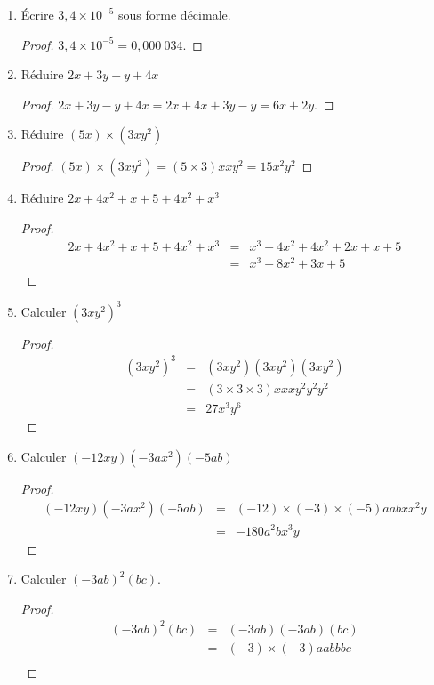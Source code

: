 \documentclass[12 pt]{extarticle}
\theoremstyle{plain}
\begin{document}
\begin{enumerate}
   \begin{proof}
   $134~542,123 = 1,345~421~23 \times 10^5$. 
   \end{proof}
   \item Écrire $3,4 \times 10^{-5}$ sous forme décimale. 
   \begin{proof}
   $3,4 \times 10^{-5} = 0,000~034$. 
   \end{proof}
   \item Réduire $2x + 3y - y + 4x$
   \begin{proof}
   $2x + 3y - y + 4x = 2x + 4x + 3y - y = 6x + 2y$. 
   \end{proof}
   \item Réduire $(5x)\times (3xy^2)$
   \begin{proof}
   $(5x)\times (3xy^2) = (5\times3)xxy^2 = 15x^2y^2 $
   \end{proof}
   \item Réduire $2x + 4x^2 + x + 5 + 4x^2 + x^3$
   \begin{proof}
   \begin{eqnarray*}
   2x + 4x^2 + x + 5 + 4x^2 + x^3&=& x^3 + 4x^2 + 4x^2 + 2x + x + 5 \\
   &=&x^3 + 8x^2 + 3x + 5
\end{eqnarray*}     
   \end{proof}
   \item Calculer $(3xy^2)^3$
   \begin{proof}
   \begin{eqnarray*}
   (3xy^2)^3 &=& (3xy^2)(3xy^2)(3xy^2) \\
   & = & (3\times 3 \times 3 )xxxy^2y^2y^2\\
   &=& 27 x^3 y^6
   \end{eqnarray*}
   \end{proof}
   \item Calculer $(-12xy)(-3ax^2)(-5ab)$
   \begin{proof}
   \begin{eqnarray*}
   (-12xy)(-3ax^2)(-5ab) & = &(-12) \times(-3)\times(-5)aabxx^2y \\
   &=& - 180 a^2bx^3y
   \end{eqnarray*}
   \end{proof}
   \item Calculer $(-3ab)^2(bc)$.
   \begin{proof}
   \begin{eqnarray*}
   (-3ab)^2(bc) & = &(-3ab)(-3ab)(bc) \\
   &=& (-3)\times(-3) aa bbb c \\

\end{eqnarray*}
\end{proof}
\end{enumerate}
\end{document}
